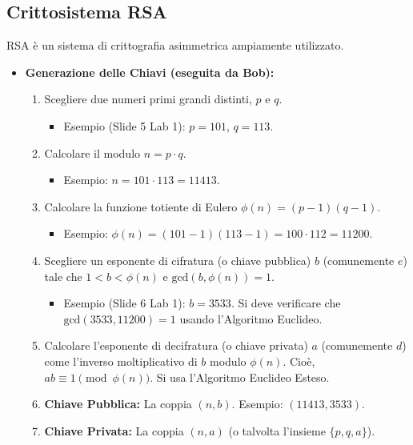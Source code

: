 \subsection{Crittosistema RSA}
RSA è un sistema di crittografia asimmetrica ampiamente utilizzato.
\begin{itemize}
    \item \textbf{Generazione delle Chiavi (eseguita da Bob):}
    \begin{enumerate}
        \item Scegliere due numeri primi grandi distinti, \(p\) e \(q\).
            \begin{itemize} \item Esempio (Slide 5 Lab 1): \(p = 101\), \(q = 113\). \end{itemize}
        \item Calcolare il modulo \(n = p \cdot q\).
            \begin{itemize} \item Esempio: \(n = 101 \cdot 113 = 11413\). \end{itemize}
        \item Calcolare la funzione totiente di Eulero \(\phi(n) = (p-1)(q-1)\).
            \begin{itemize} \item Esempio: \(\phi(n) = (101-1)(113-1) = 100 \cdot 112 = 11200\). \end{itemize}
        \item Scegliere un esponente di cifratura (o chiave pubblica) \(b\) (comunemente \(e\)) tale che \(1 < b < \phi(n)\) e \(\text{gcd}(b, \phi(n)) = 1\).
            \begin{itemize} \item Esempio (Slide 6 Lab 1): \(b = 3533\). Si deve verificare che \(\text{gcd}(3533, 11200) = 1\) usando l'Algoritmo Euclideo. \end{itemize}
        \item Calcolare l'esponente di decifratura (o chiave privata) \(a\) (comunemente \(d\)) come l'inverso moltiplicativo di \(b\) modulo \(\phi(n)\). Cioè, \(ab \equiv 1 \pmod{\phi(n)}\). Si usa l'Algoritmo Euclideo Esteso.
        \item \textbf{Chiave Pubblica:} La coppia \((n, b)\). Esempio: \((11413, 3533)\).
        \item \textbf{Chiave Privata:} La coppia \((n, a)\) (o talvolta l'insieme \(\{p, q, a\}\)).
    \end{enumerate}


\end{itemize}
